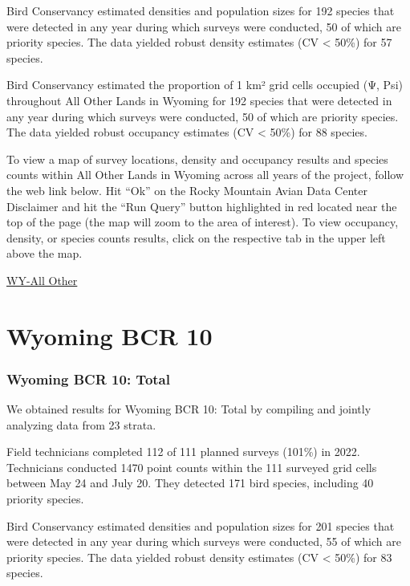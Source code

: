 \documentclass[
  letterpaper,
  DIV=11,
  numbers=noendperiod,
  oneside]{scrreprt}
\begin{document}
Bird Conservancy estimated densities and population sizes for 192
species that were detected in any year during which surveys were
conducted, 50 of which are priority species. The data yielded robust
density estimates (CV \textless{} 50\%) for 57 species.

Bird Conservancy estimated the proportion of 1 km² grid cells occupied
(Ψ, Psi) throughout All Other Lands in Wyoming for 192 species that were
detected in any year during which surveys were conducted, 50 of which
are priority species. The data yielded robust occupancy estimates (CV
\textless{} 50\%) for 88 species.

To view a map of survey locations, density and occupancy results and
species counts within All Other Lands in Wyoming across all years of the
project, follow the web link below. Hit ``Ok'' on the Rocky Mountain
Avian Data Center Disclaimer and hit the ``Run Query'' button
highlighted in red located near the top of the page (the map will zoom
to the area of interest). To view occupancy, density, or species counts
results, click on the respective tab in the upper left above the map.

\href{http://www.rmbo.org/new_site/adc/QueryWindow.aspx\#N4IgzgrgDgpgTmALnAhoiBbEAuABCAdQE0BaAQQBsLcB5RAC3hAF8g==}{WY-All
Other}

\hypertarget{wyoming-bcr-10}{%
\section{Wyoming BCR 10}\label{wyoming-bcr-10}}

\hypertarget{wyoming-bcr-10-total}{%
\subsubsection{Wyoming BCR 10: Total}\label{wyoming-bcr-10-total}}

We obtained results for Wyoming BCR 10: Total by compiling and jointly
analyzing data from 23 strata.

Field technicians completed 112 of 111 planned surveys (101\%) in 2022.
Technicians conducted 1470 point counts within the 111 surveyed grid
cells between May 24 and July 20. They detected 171 bird species,
including 40 priority species.

Bird Conservancy estimated densities and population sizes for 201
species that were detected in any year during which surveys were
conducted, 55 of which are priority species. The data yielded robust
density estimates (CV \textless{} 50\%) for 83 species.
\end{document}
